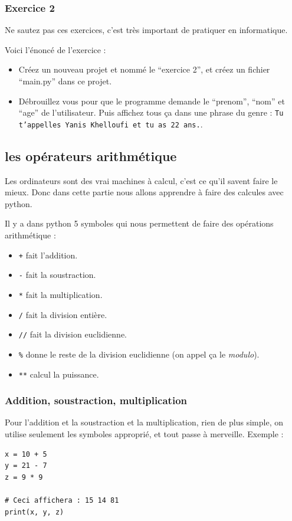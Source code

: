 \documentclass[12pt]{article}
\newcommand{\code}[1]{\colorbox{light-gray}{\texttt{#1}}}
\begin{document}
        \subsubsection{Exercice 2}
            Ne sautez pas ces exercices, c'est très important de pratiquer en informatique.

            Voici l'énoncé de l'exercice :
            \begin{itemize}
                \item Créez un nouveau projet et nommé le ``exercice 2'', et créez un fichier ``main.py'' dans ce
                    projet.
                \item Débrouillez vous pour que le programme demande le ``prenom'', ``nom'' et ``age'' de l'utilisateur.
                    Puis affichez tous ça dans une phrase du genre : \code{Tu t'appelles Yanis Khelloufi et tu as 22 ans.}.
            \end{itemize}


\clearpage

    \subsection{les opérateurs arithmétique}
        Les ordinateurs sont des vrai machines à calcul, c'est ce qu'il savent faire le mieux. Donc dans cette partie
        nous allons apprendre à faire des calcules avec python.

        Il y a dans python 5 symboles qui nous permettent de faire des opérations arithmétique :
        \begin{itemize}
            \item \code{+} fait l'addition.
            \item \code{-} fait la soustraction.
            \item \code{*} fait la multiplication.
            \item \code{/} fait la division entière.
            \item \code{//} fait la division euclidienne.
            \item \code{\%} donne le reste de la division euclidienne (on appel ça le \emph{modulo}).
            \item \code{**} calcul la puissance.
        \end{itemize}

        \subsubsection{Addition, soustraction, multiplication}
            Pour l'addition et la soustraction et la multiplication, rien de plus simple, on utilise seulement
            les symboles approprié, et tout passe à merveille. Exemple :
            \begin{lstlisting}[style=code]
x = 10 + 5
y = 21 - 7
z = 9 * 9

# Ceci affichera : 15 14 81
print(x, y, z)
            \end{lstlisting}
\end{document}
